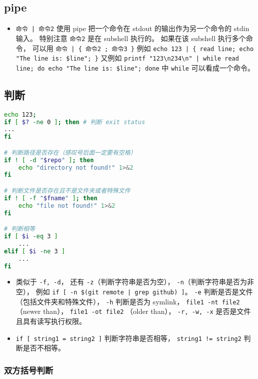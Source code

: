 \subsection{pipe}
\begin{itemize}
\item \verb`命令 | 命令2` 使用 pipe 把一个命令在 stdout 的输出作为另一个命令的 stdin 输入。 特别注意 \verb`命令2` 是在 subshell 执行的。 如果在该 subshell 执行多个命令， 可以用 \verb`命令 | { 命令2 ; 命令3 }` 例如 \verb`echo 123 | { read line; echo "The line is: $line"; }` 又例如 \verb`printf "123\n234\n" | while read line; do echo "The line is: $line"; done` 中 \verb`while` 可以看成一个命令。
\end{itemize}


\subsection{判断}
\begin{lstlisting}[language=bash]
echo 123;
if [ $? -ne 0 ]; then # 判断 exit status
...
fi

# 判断路径是否存在（感叹号后面一定要有空格）
if ! [ -d "$repo" ]; then
    echo "directory not found!" 1>&2
fi

# 判断文件是否存在且不是文件夹或者特殊文件
if ! [ -f "$fname" ]; then
    echo "file not found!" 1>&2
fi

# 判断相等
if [ $i -eq 3 ]
    ...
elif [ $i -ne 3 ]
    ...
fi
\end{lstlisting}
\begin{itemize}
\item 类似于 \verb`-f, -d`， 还有 \verb`-z`（判断字符串是否为空）， \verb`-n`（判断字符串是否为非空）， 例如 \verb`if [ -n $(git remote | grep github) ]`。  \verb`-e` 判断是否是文件（包括文件夹和特殊文件）， \verb`-h` 判断是否为 symlink， \verb`file1 -nt file2` （newer than）， \verb`file1 -ot file2` （older than）， \verb`-r, -w, -x` 是否是文件且具有读写执行权限。
\item \verb`if [ string1 = string2 ]` 判断字符串是否相等， \verb`string1 != string2` 判断是否不相等。
\end{itemize}

\subsubsection{双方括号判断}

